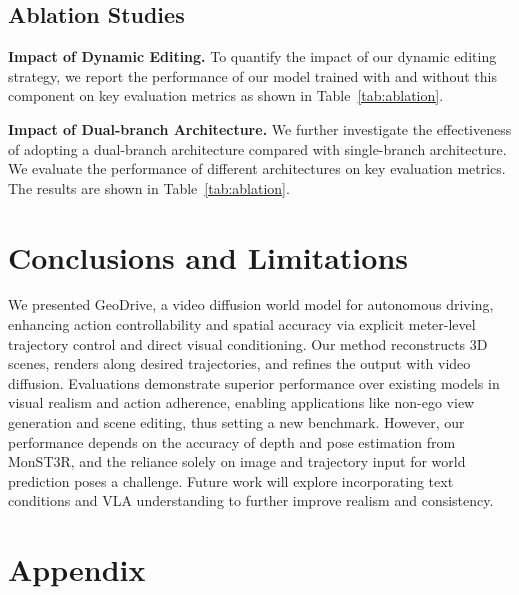 \documentclass{article}
\begin{document}
\subsection{Ablation Studies}
\label{sec:ablation}

\textbf{Impact of Dynamic Editing.}
To quantify the impact of our dynamic editing strategy, we report the performance of our model trained with and without this component on key evaluation metrics as shown in Table~\ref{tab:ablation}.


\textbf{Impact of Dual-branch Architecture.}
We further investigate the effectiveness of adopting a dual-branch architecture compared with single-branch architecture. We evaluate the performance of different architectures on key evaluation metrics. The results are shown in Table~\ref{tab:ablation}.

\section{Conclusions and Limitations}
\label{sec:conclusion}

We presented GeoDrive, a video diffusion world model for autonomous driving, enhancing action controllability and spatial accuracy via explicit meter-level trajectory control and direct visual conditioning. Our method reconstructs 3D scenes, renders along desired trajectories, and refines the output with video diffusion. Evaluations demonstrate superior performance over existing models in visual realism and action adherence, enabling applications like non-ego view generation and scene editing, thus setting a new benchmark. However, our performance depends on the accuracy of depth and pose estimation from MonST3R, and the reliance solely on image and trajectory input for world prediction poses a challenge. Future work will explore incorporating text conditions and VLA understanding to further improve realism and consistency.

{\small


}

 \newpage
\appendix

\renewcommand\thesection{\Alph{section}}


\section*{\Large Appendix}

\setcounter{section}{0}
\end{document}
